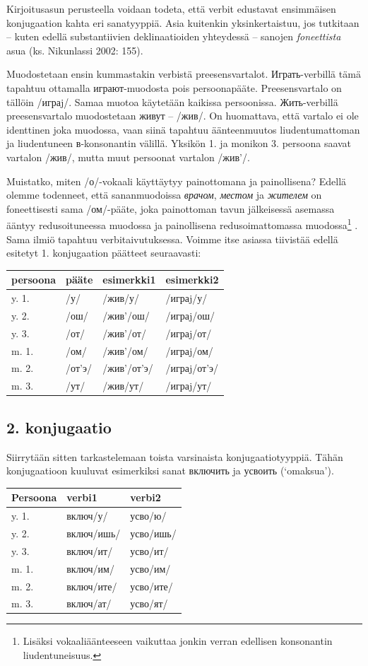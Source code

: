 \documentclass[]{scrreprt}
\begin{document}
Kirjoitusasun perusteella voidaan todeta, että verbit edustavat
ensimmäisen konjugaation kahta eri sanatyyppiä. Asia kuitenkin
yksinkertaistuu, jos tutkitaan -- kuten edellä substantiivien
deklinaatioiden yhteydessä -- sanojen \emph{foneettista} asua (ks.
Nikunlassi 2002: 155).

Muodostetaan ensin kummastakin verbistä preesensvartalot.
Играть-verbillä tämä tapahtuu ottamalla играют-muodosta pois
persoonapääte. Preesensvartalo on tällöin /играj/. Samaa muotoa
käytetään kaikissa persoonissa. Жить-verbillä preesensvartalo
muodostetaan живут -- /жив/. On huomattava, että vartalo ei ole
identtinen joka muodossa, vaan siinä tapahtuu äänteenmuutos
liudentumattoman ja liudentuneen в-konsonantin välillä. Yksikön 1. ja
monikon 3. persoona saavat vartalon /жив/, mutta muut persoonat vartalon
/жив'/.

Muistatko, miten /о/-vokaali käyttäytyy painottomana ja painollisena?
Edellä olemme todenneet, että sananmuodoissa \emph{врачом},
\emph{местом} ja \emph{жителем} on foneettisesti sama /ом/-pääte, joka
painottoman tavun jälkeisessä asemassa ääntyy redusoituneessa muodossa
ja painollisena redusoimattomassa muodossa\footnote{Lisäksi
  vokaaliäänteeseen vaikuttaa jonkin verran edellisen konsonantin
  liudentuneisuus.} . Sama ilmiö tapahtuu verbitaivutuksessa. Voimme
itse asiassa tiivistää edellä esitetyt 1. konjugaation päätteet
seuraavasti:

\begin{longtable}[c]{@{}llll@{}}
\toprule
persoona & pääte & esimerkki1 & esimerkki2\tabularnewline
\midrule
\endhead
y. 1. & /у/ & /жив/у/ & /играj/у/\tabularnewline
y. 2. & /ош/ & /жив'/ош/ & /играj/ош/\tabularnewline
y. 3. & /от/ & /жив'/от/ & /играj/от/\tabularnewline
m. 1. & /ом/ & /жив'/ом/ & /играj/ом/\tabularnewline
m. 2. & /от'э/ & /жив'/от'э/ & /играj/от'э/\tabularnewline
m. 3. & /ут/ & /жив/ут/ & /играj/ут/\tabularnewline
\bottomrule
\end{longtable}

\subsection{2. konjugaatio}\label{konjugaatio-1}

Siirrytään sitten tarkastelemaan toista varsinaista konjugaatiotyyppiä.
Tähän konjugaatioon kuuluvat esimerkiksi sanat включить ja усвоить
(`omaksua').

\begin{longtable}[c]{@{}lll@{}}
\toprule
Persoona & verbi1 & verbi2\tabularnewline
\midrule
\endhead
y. 1. & включ/у/ & усво/ю/\tabularnewline
y. 2. & включ/ишь/ & усво/ишь/\tabularnewline
y. 3. & включ/ит/ & усво/ит/\tabularnewline
m. 1. & включ/им/ & усво/им/\tabularnewline
m. 2. & включ/ите/ & усво/ите/\tabularnewline
m. 3. & включ/ат/ & усво/ят/\tabularnewline
\bottomrule
\end{longtable}
\end{document}
